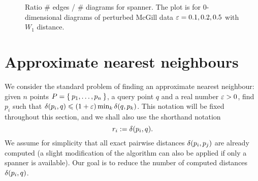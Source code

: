 \begin{figure}[!htbp]
    \begin{centering}
\end{centering}
    \caption{Ratio \# edges /  \# diagrams for  \bgrdy spanner. The plot is for 0-dimensional diagrams of perturbed McGill data
    $\varepsilon = 0.1, 0.2, 0.5$ with $W_1$ distance.}
    \label{fig:spanner_ratio_mcgill_perturbed}
\end{figure}





\section{Approximate nearest neighbours}
\label{sec:ann}
We consider the standard problem of finding an approximate nearest neighbour: given
$n$ points $P = \Set{p_1, \dots, p_n}$, a query point $q$ and a real number $\varepsilon > 0$,
find $p_i$ such that $\delta(p_i, q) \leqslant (1 + \varepsilon) \min_{k} \delta(q, p_k)$. This notation will be fixed throughout this 
section, and we shall also use the shorthand notation
\[
    r_i := \delta(p_i, q).
\]
We assume for simplicity
that all exact pairwise distances $\delta(p_i, p_j)$ are already computed
(a slight modification of the algorithm can also be applied if only a spanner is available).
Our goal is to reduce the number of computed distances $\delta(p_i, q)$. 


